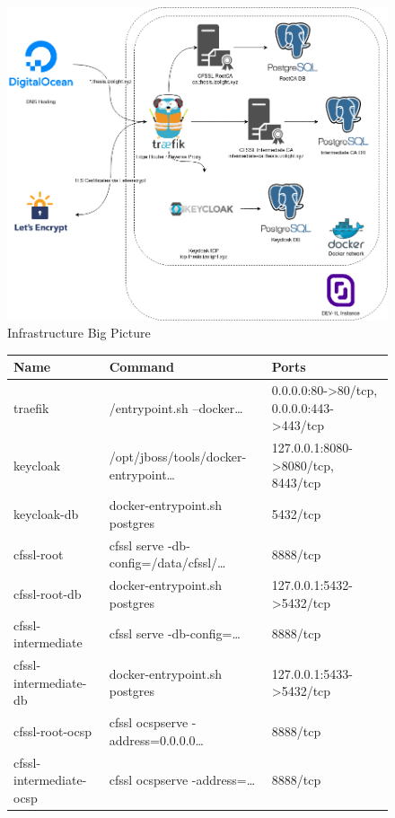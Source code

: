 \begin{figure}
    \includegraphics[width=0.9\linewidth]{images/infrastructure.png}
    \caption{Infrastructure Big Picture}
    \label{fig:infrastructurebigpicture}
\end{figure}

\begin{figure}
    \begin{center}
        \begin{tabular}{p{3.4cm}|p{5.7cm}|p{6.2cm}}
            \textbf{Name} & \textbf{Command} & \textbf{Ports} \\
            \hline
            traefik & /entrypoint.sh --docker\ldots & 0.0.0.0:80->80/tcp, 0.0.0.0:443->443/tcp \\*
            \hline
            keycloak & /opt/jboss/tools/docker-entrypoint\ldots & 127.0.0.1:8080->8080/tcp, 8443/tcp \\*
            \hline
            keycloak-db & docker-entrypoint.sh postgres & 5432/tcp \\*
            \hline
            cfssl-root & cfssl serve -db-config=/data/cfssl/\ldots & 8888/tcp \\*
            \hline
            cfssl-root-db & docker-entrypoint.sh postgres & 127.0.0.1:5432->5432/tcp \\*
            \hline
            cfssl-intermediate & cfssl serve -db-config=\ldots & 8888/tcp \\*
            \hline
            cfssl-intermediate-db & docker-entrypoint.sh postgres & 127.0.0.1:5433->5432/tcp \\*
            \hline
            cfssl-root-ocsp & cfssl ocspserve -address=0.0.0.0\ldots & 8888/tcp \\*
            \hline
            cfssl-intermediate-ocsp & cfssl ocspserve -address=\ldots & 8888/tcp \\*
        \end{tabular}
    \end{center}
\end{figure}

